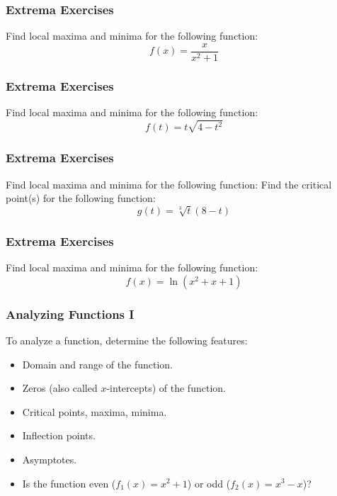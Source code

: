 \documentclass[xcolor=dvipsnames]{beamer}
\begin{document}
\begin{frame}
  \frametitle{Extrema Exercises}
{\ubung} Find local maxima and minima for the following function:
\begin{equation}
  \label{eq:xxyxx2}
f(x)=\frac{x}{x^{2}+1}
\end{equation}
\end{frame}

\begin{frame}
  \frametitle{Extrema Exercises}
{\ubung} Find local maxima and minima for the following function:
\begin{equation}
  \label{eq:xxyxx3}
f(t)=t\sqrt{4-t^{2}}
\end{equation}
\end{frame}

\begin{frame}
  \frametitle{Extrema Exercises}
{\ubung} Find local maxima and minima for the following function:
Find the critical point(s) for the following function:
\begin{equation}
  \label{eq:xxyxx4}
g(t)=\sqrt[3]{t}(8-t)
\end{equation}
\end{frame}

\begin{frame}
  \frametitle{Extrema Exercises}
{\ubung} Find local maxima and minima for the following function:
\begin{equation}
  \label{eq:xxyxx5}
f(x)=\ln(x^{2}+x+1)
\end{equation}
\end{frame}

\begin{frame}
  \frametitle{Analyzing Functions I}
To analyze a function, determine the following features:
\begin{itemize}
\item Domain and range of the function.
\item Zeros (also called $x$-intercepts) of the function.
\item Critical points, maxima, minima.
\item Inflection points.
\item Asymptotes.
\item Is the function even ($f_{1}(x)=x^{2}+1$) or odd ($f_{2}(x)=x^{3}-x$)?
\end{itemize}
\end{frame}
\end{document}
